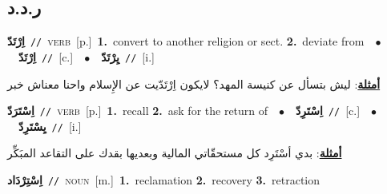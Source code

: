 \documentclass[10pt,a4paper,twoside]{article} %
\begin{document}
\begin{multicols}{2}
\vspace{-3mm}
\subsection*{\color{blue}\foreignlanguage{arabic}{ر.د.د}\color{blue}{}} 

{\setlength\topsep{0pt}\textbf{\foreignlanguage{arabic}{اِرْتَدّ}}\ {\color{gray}\texttt{//}\color{black}}\ \textsc{verb}\ [p.]\ \textbf{1.}~convert to another religion or sect.  \textbf{2.}~deviate from\ \ $\bullet$\ \ \setlength\topsep{0pt}\textbf{\foreignlanguage{arabic}{اِرْتَدّ}}\ {\color{gray}\texttt{//}\color{black}}\ [c.]\ \ $\bullet$\ \ \setlength\topsep{0pt}\textbf{\foreignlanguage{arabic}{يِرْتَدّ}}\ {\color{gray}\texttt{//}\color{black}}\ [i.]\  \begin{flushright}\color{gray}\foreignlanguage{arabic}{\textbf{\underline{\foreignlanguage{arabic}{أمثلة}}}: ليش بتسأل عن كنيسة المهد؟ لايكون اِرْتَدّيت عن الإِسلام واحنا معناش خبر}\end{flushright}\color{black}} \vspace{2mm}

{\setlength\topsep{0pt}\textbf{\foreignlanguage{arabic}{اِسْتَرَدّ}}\ {\color{gray}\texttt{//}\color{black}}\ \textsc{verb}\ [p.]\ \textbf{1.}~recall  \textbf{2.}~ask for the return of\ \ $\bullet$\ \ \setlength\topsep{0pt}\textbf{\foreignlanguage{arabic}{اِسْتَرِدّ}}\ {\color{gray}\texttt{//}\color{black}}\ [c.]\ \ $\bullet$\ \ \setlength\topsep{0pt}\textbf{\foreignlanguage{arabic}{يِسْتَرِدّ}}\ {\color{gray}\texttt{//}\color{black}}\ [i.]\  \begin{flushright}\color{gray}\foreignlanguage{arabic}{\textbf{\underline{\foreignlanguage{arabic}{أمثلة}}}: بدي أسْتَرِد كل مستحقّاتي المالية وبعديها بقدك على التقاعد المبَكِّر}\end{flushright}\color{black}} \vspace{2mm}

{\setlength\topsep{0pt}\textbf{\foreignlanguage{arabic}{اِسْتِرْدَاد}}\ {\color{gray}\texttt{//}\color{black}}\ \textsc{noun}\ [m.]\ \textbf{1.}~reclamation  \textbf{2.}~recovery  \textbf{3.}~retraction\ } \vspace{2mm}


\end{multicols}
\end{document}
